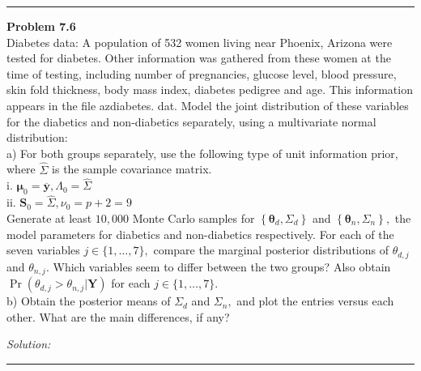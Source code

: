 \documentclass[a4paper, 11pt]{article}
\newenvironment{problem}[2][Problem]
    { \begin{mdframed}[backgroundcolor=gray!20] \textbf{#1 #2} \\}
    {  \end{mdframed}}
\newenvironment{solution}
    {\textit{Solution:}}
    {}
\begin{document}
\noindent\rule{7in}{2.8pt}


\begin{problem}{7.6}
Diabetes data: A population of 532 women living near Phoenix, Arizona were tested for diabetes. Other information was gathered from these women at the time of testing, including number of pregnancies, glucose level, blood pressure, skin fold thickness, body mass index, diabetes pedigree and age. This information appears in the file azdiabetes. dat. Model the joint distribution of these variables for the diabetics and non-diabetics separately, using a multivariate normal distribution:\\
a) For both groups separately, use the following type of unit information prior, where $\hat{\Sigma}$ is the sample covariance matrix.\\
i. $\boldsymbol{\mu}_{0}=\overline{\boldsymbol{y}}, \Lambda_{0}=\hat{\Sigma}$\\
ii. $\mathbf{S}_{0}=\hat{\Sigma}, \nu_{0}=p+2=9$\\
Generate at least $10,000$ Monte Carlo samples for $\left\{\boldsymbol{\theta}_{d}, \Sigma_{d}\right\}$ and $\left\{\boldsymbol{\theta}_{n}, \Sigma_{n}\right\},$ the model parameters for diabetics and non-diabetics respectively. For each of the seven variables $j \in\{1, \ldots, 7\},$ compare the marginal posterior distributions of $\theta_{d, j}$ and $\theta_{n, j} .$ Which variables seem
to differ between the two groups? Also obtain $\operatorname{Pr}\left(\theta_{d, j}>\theta_{n, j} | \mathbf{Y}\right)$ for each $j \in\{1, \ldots, 7\}$.\\
b) Obtain the posterior means of $\Sigma_{d}$ and $\Sigma_{n},$ and plot the entries versus each other. What are the main differences, if any?

\end{problem}
\begin{solution}


\end{solution} 

\noindent\rule{7in}{2.8pt}

\end{document}
